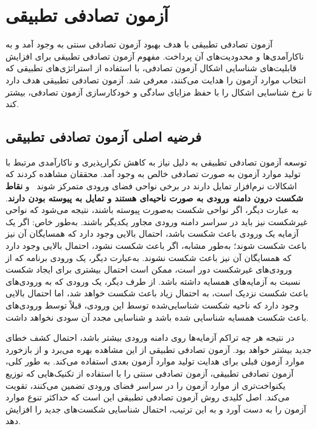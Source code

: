 \section{آزمون تصادفی تطبیقی}
آزمون تصادفی تطبیقی
 \cite{huang2019survey}
   با هدف بهبود آزمون تصادفی سنتی به وجود آمد و به ناکارآمدی‌ها و محدودیت‌های آن پرداخت. مفهوم آزمون تصادفی تطبیقی برای افزایش قابلیت‌های شناسایی اشکال آزمون تصادفی، با استفاده از استراتژی‌های تطبیقی که انتخاب موارد آزمون را هدایت می‌کنند، معرفی شد. آزمون تصادفی تطبیقی هدف دارد تا نرخ شناسایی اشکال را با حفظ مزایای سادگی و خودکارسازی آزمون تصادفی، بیشتر کند.

\subsection{فرضیه اصلی آزمون تصادفی تطبیقی}

توسعه آزمون تصادفی تطبیقی به دلیل نیاز به کاهش تکرارپذیری و ناکارآمدی مرتبط با تولید موارد آزمون به صورت تصادفی خالص به وجود آمد. محققان مشاهده کردند که اشکالات نرم‌افزار تمایل دارند در برخی نواحی فضای ورودی متمرکز شوند~\cite{white1980domain}\cite{ammann1988data}\cite{finelli1991nasa}\cite{bishopvariation}\cite{schneckenburger2007towards}
 و \textbf{نقاط شکست درون دامنه ورودی به صورت ناحیه‌ای هستند و تمایل به پیوسته بودن دارند}.
به عبارت دیگر، اگر نواحی شکست به‌صورت پیوسته باشند، نتیجه می‌شود که نواحی غیرشکست نیز باید در سراسر دامنه ورودی مجاور یکدیگر باشند. به‌طور خاص: اگر یک آزمایه  یک ورودی باعث شکست باشد، احتمال بالایی وجود دارد که همسایگان آن نیز باعث شکست شوند؛ به‌طور مشابه، اگر  باعث شکست نشود، احتمال بالایی وجود دارد که همسایگان آن نیز باعث شکست نشوند. به‌عبارت دیگر، یک ورودی برنامه که از ورودی‌های غیرشکست دور است، ممکن است احتمال بیشتری برای ایجاد شکست نسبت به آزمایه‌های همسایه داشته باشد. از طرف دیگر، یک ورودی که به ورودی‌های باعث شکست نزدیک است، به احتمال زیاد باعث شکست خواهد شد، اما احتمال بالایی وجود دارد که ناحیه شکست شناسایی‌شده توسط این ورودی، قبلاً توسط ورودی‌های باعث شکست همسایه شناسایی شده باشد و شناسایی مجدد آن سودی نخواهد داشت.

 در نتیجه هر چه تراکم آزمایه‌ها روی دامنه ورودی بیشتر باشد، احتمال کشف خطای جدید بیشتر خواهد بود. آزمون تصادفی تطبیقی از این مشاهده بهره می‌برد و از بازخورد موارد آزمون قبلی برای هدایت تولید موارد آزمون بعدی استفاده می‌کند. به طور کلی، آزمون تصادفی تطبیقی، آزمون تصادفی سنتی را با استفاده از تکنیک‌هایی که توزیع یکنواخت‌تری از موارد آزمون را در سراسر فضای ورودی تضمین می‌کنند، تقویت می‌کند. اصل کلیدی روش آزمون تصادفی تطبیقی این است که حداکثر تنوع موارد آزمون را به دست آورد و به این ترتیب، احتمال شناسایی شکست‌های جدید را افزایش دهد\cite{chen2010adaptive}.

